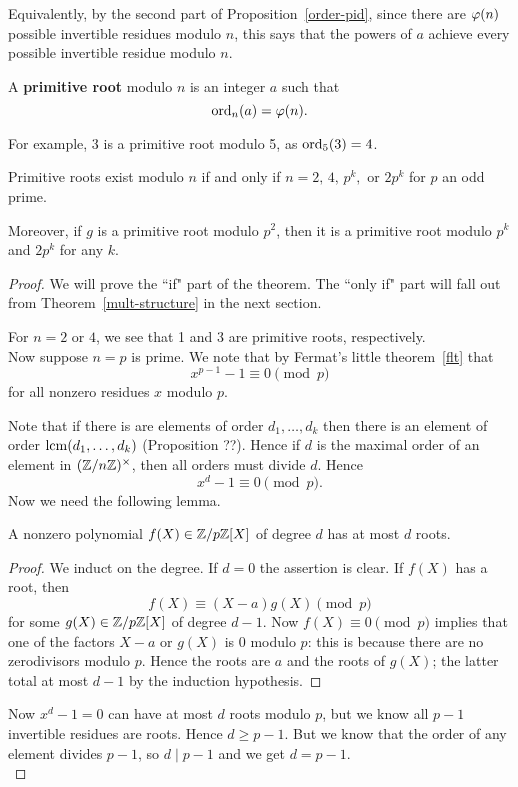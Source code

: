 Equivalently, by the second part of Proposition~\ref{order-pid}, since there are $\varphi(n)$ possible invertible residues modulo $n$, this says that the powers of $a$ achieve every possible invertible residue modulo $n$.
\begin{df}
A \textbf{primitive root} modulo $n$ is an integer $a$ such that 
\[
\operatorname{ord}_n(a)=\varphi(n).
\]
\end{df}
For example, 3 is a primitive root modulo 5, as $\operatorname{ord}_5(3)=4$.
\begin{thm}\label{primitive-roots-exist}
Primitive roots exist modulo $n$ if and only if $n=2,\, 4,\, p^k,\text{ or } 2p^k$ for $p$ an odd prime.

Moreover, if $g$ is a primitive root modulo $p^2$, then it is a primitive root modulo $p^k$ and $2p^k$ for any $k$.
\end{thm}
\begin{proof}
We will prove the ``if" part of the theorem. The ``only if" part will fall out from Theorem~\ref{mult-structure} in the next section.

For $n=2$ or $4$, we see that 1 and 3 are primitive roots, respectively.\\

 Now suppose $n=p$ is prime. We note that by Fermat's little theorem~\ref{flt} that
\[
x^{p-1}-1\equiv 0\pmod{p}
\]
for all nonzero residues $x$ modulo $p$.

Note that if there is are elements of order $d_1,\ldots, d_k$ then there is an element of order $\operatorname{lcm}(d_1,\ldots, d_k)$ (Proposition ??). Hence if $d$ is the maximal order of an element in $(\mathbb{Z}/n\mathbb{Z})^{\times}$, then all orders must divide $d$. Hence
\[
x^d-1\equiv 0\pmod{p}.
\]
Now we need the following lemma.
\begin{lem}
A nonzero polynomial $f(X)\in \mathbb{Z}/p\mathbb{Z}[X]$ of degree $d$ has at most $d$ roots. 
\end{lem}
\begin{proof}
We induct on the degree. If $d=0$ the assertion is clear.
If $f(X)$ has a root, then
\[
f(X)\equiv (X-a)g(X)\pmod{p}
\]
for some $g(X)\in\mathbb{Z}/p\mathbb{Z}[X]$ of degree $d-1$. Now $f(X)\equiv 0\pmod{p}$ implies that one of the factors $X-a$ or $g(X)$ is 0 modulo $p$: this is because there are no zerodivisors modulo $p$. Hence the roots are $a$ and the roots of $g(X)$; the latter total at most $d-1$ by the induction hypothesis.
\end{proof}
Now $x^d-1=0$ can have at most $d$ roots modulo $p$, but we know all $p-1$ invertible residues are roots. Hence $d\ge p-1$. But we know that the order of any element divides $p-1$, so $d\mid p-1$ and we get $d=p-1$.\\


\end{proof}
